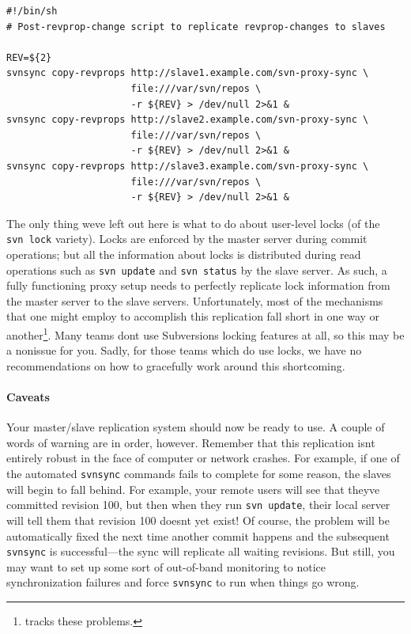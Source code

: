 \begin{verbatim}
#!/bin/sh
# Post-revprop-change script to replicate revprop-changes to slaves

REV=${2}
svnsync copy-revprops http://slave1.example.com/svn-proxy-sync \
                      file:///var/svn/repos \
                      -r ${REV} > /dev/null 2>&1 &
svnsync copy-revprops http://slave2.example.com/svn-proxy-sync \
                      file:///var/svn/repos \
                      -r ${REV} > /dev/null 2>&1 &
svnsync copy-revprops http://slave3.example.com/svn-proxy-sync \
                      file:///var/svn/repos \
                      -r ${REV} > /dev/null 2>&1 &
\end{verbatim}

The only thing we\textquotesingle ve left out here is what to do about
user-level locks (of the \texttt{svn\ lock} variety). Locks are enforced
by the master server during commit operations; but all the information
about locks is distributed during read operations such as
\texttt{svn\ update} and \texttt{svn\ status} by the slave server. As
such, a fully functioning proxy setup needs to perfectly replicate lock
information from the master server to the slave servers. Unfortunately,
most of the mechanisms that one might employ to accomplish this
replication fall short in one way or another\footnote{\href{https://subversion.apache.org/issue3457}{}
  tracks these problems.}. Many teams don\textquotesingle t use
Subversion\textquotesingle s locking features at all, so this may be a
nonissue for you. Sadly, for those teams which do use locks, we have no
recommendations on how to gracefully work around this shortcoming.

\paragraph{Caveats}\label{svn.serverconfig.httpd.extra.writethruproxy.caveats}

Your master/slave replication system should now be ready to use. A
couple of words of warning are in order, however. Remember that this
replication isn\textquotesingle t entirely robust in the face of
computer or network crashes. For example, if one of the automated
\texttt{svnsync} commands fails to complete for some reason, the slaves
will begin to fall behind. For example, your remote users will see that
they\textquotesingle ve committed revision 100, but then when they run
\texttt{svn\ update}, their local server will tell them that revision
100 doesn\textquotesingle t yet exist! Of course, the problem will be
automatically fixed the next time another commit happens and the
subsequent \texttt{svnsync} is successful---the sync will replicate all
waiting revisions. But still, you may want to set up some sort of
out-of-band monitoring to notice synchronization failures and force
\texttt{svnsync} to run when things go wrong.

